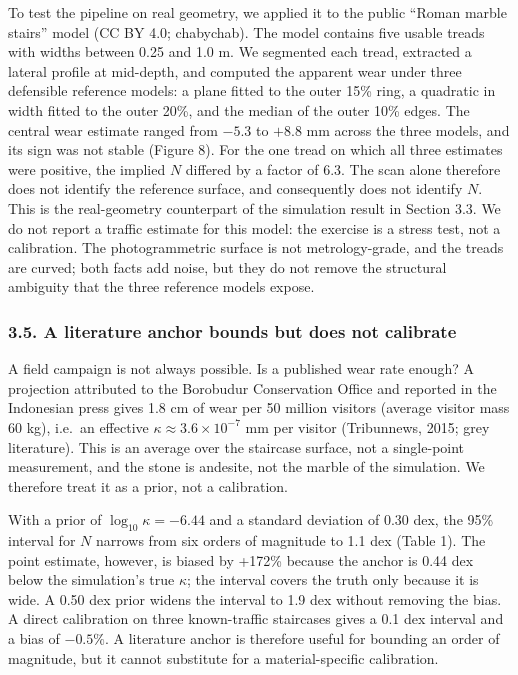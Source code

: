 \documentclass[
]{article}
\begin{document}
To test the pipeline on real geometry, we applied it to the public
``Roman marble stairs'' model (CC BY 4.0; chabychab). The model contains
five usable treads with widths between 0.25 and 1.0 m. We segmented each
tread, extracted a lateral profile at mid-depth, and computed the
apparent wear under three defensible reference models: a plane fitted to
the outer 15\% ring, a quadratic in width fitted to the outer 20\%, and
the median of the outer 10\% edges. The central wear estimate ranged
from \(-5.3\) to \(+8.8\) mm across the three models, and its sign was
not stable (Figure 8). For the one tread on which all three estimates
were positive, the implied \(N\) differed by a factor of 6.3. The scan
alone therefore does not identify the reference surface, and
consequently does not identify \(N\). This is the real-geometry
counterpart of the simulation result in Section 3.3. We do not report a
traffic estimate for this model: the exercise is a stress test, not a
calibration. The photogrammetric surface is not metrology-grade, and the
treads are curved; both facts add noise, but they do not remove the
structural ambiguity that the three reference models expose.

\subsubsection{3.5. A literature anchor bounds but does not
calibrate}\label{a-literature-anchor-bounds-but-does-not-calibrate}

A field campaign is not always possible. Is a published wear rate
enough? A projection attributed to the Borobudur Conservation Office and
reported in the Indonesian press gives 1.8 cm of wear per 50 million
visitors (average visitor mass 60 kg), i.e.~an effective
\(\kappa\approx3.6\times10^{-7}\) mm per visitor (Tribunnews, 2015; grey
literature). This is an average over the staircase surface, not a
single-point measurement, and the stone is andesite, not the marble of
the simulation. We therefore treat it as a prior, not a calibration.

With a prior of \(\log_{10}\kappa=-6.44\) and a standard deviation of
0.30 dex, the 95\% interval for \(N\) narrows from six orders of
magnitude to 1.1 dex (Table 1). The point estimate, however, is biased
by +172\% because the anchor is 0.44 dex below the simulation's true
\(\kappa\); the interval covers the truth only because it is wide. A
0.50 dex prior widens the interval to 1.9 dex without removing the bias.
A direct calibration on three known-traffic staircases gives a 0.1 dex
interval and a bias of \(-0.5\%\). A literature anchor is therefore
useful for bounding an order of magnitude, but it cannot substitute for
a material-specific calibration.
\end{document}
